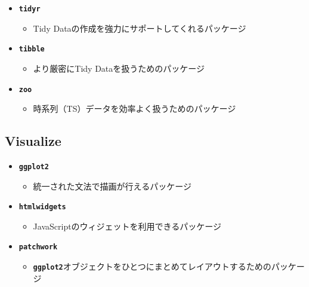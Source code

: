 \documentclass[
  12pt,
]{book}
\providecommand{\tightlist}{%
  \setlength{\itemsep}{0pt}\setlength{\parskip}{0pt}}
\begin{document}
\begin{itemize}
\tightlist
\item
  \textbf{\texttt{tidyr}}

  \begin{itemize}
  \tightlist
  \item
    Tidy Dataの作成を強力にサポートしてくれるパッケージ\citep{R-tidyr}
  \end{itemize}
\item
  \textbf{\texttt{tibble}}

  \begin{itemize}
  \tightlist
  \item
    より厳密にTidy Dataを扱うためのパッケージ\citep{R-tibble}
  \end{itemize}
\item
  \textbf{\texttt{zoo}}

  \begin{itemize}
  \tightlist
  \item
    時系列（TS）データを効率よく扱うためのパッケージ\citep{R-zoo}
  \end{itemize}
\end{itemize}

\hypertarget{visualize-1}{%
\subsection*{Visualize}\label{visualize-1}}

\begin{itemize}
\tightlist
\item
  \textbf{\texttt{ggplot2}}

  \begin{itemize}
  \tightlist
  \item
    統一された文法で描画が行えるパッケージ\citep{R-ggplot2}
  \end{itemize}
\item
  \textbf{\texttt{htmlwidgets}}

  \begin{itemize}
  \tightlist
  \item
    JavaScriptのウィジェットを利用できるパッケージ\citep{R-htmlwidgets}
  \end{itemize}
\item
  \textbf{\texttt{patchwork}}

  \begin{itemize}
  \tightlist
  \item
    \textbf{\texttt{ggplot2}}オブジェクトをひとつにまとめてレイアウトするためのパッケージ\citep{R-patchwork}
  \end{itemize}
\end{itemize}
\end{document}
